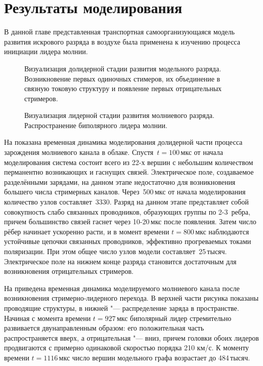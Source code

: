 \section{Результаты моделирования}
\label{sec:model-results}
В данной главе представленная транспортная самоорганизующаяся модель развития искрового разряда в воздухе была применена к изучению процесса инициации лидера молнии.
\begin{figure}[h]
	\caption{Визуализация долидерной стадии развития модельного разряда. Возникновение первых одиночных стимеров, их объединение в связную токовую структуру и появление первых отрицательных стримеров.}
	\label{fig:pre-leader}
\end{figure}

\begin{figure}[h]
	\caption{Визуализация лидерной стадии развития молниевого разряда. Распространение биполярного лидера молнии.}
	\label{fig:model-leader-composition}
\end{figure}
На  показана временная динамика моделирования долидерной части процесса зарождения молниевого канала в облаке. Спустя~$t=100$\,мкс от начала моделирования система состоит всего из 22-х вершин с небольшим количеством перманентно возникающих и гаснущих связей. Электрическое поле, создаваемое разделёнными зарядами, на данном этапе недостаточно для возникновения большего числа стримерных каналов. Через~500\,мкс от начала моделирования количество узлов составляет~3330. Разряд на данном этапе представляет собой совокупность слабо связанных проводников, образующих группы по 2-3~ребра, причем большинство связей гаснет через 10-20\,мкс после появления. Затем число рёбер начинает ускоренно расти, и в момент времени $t = 800$\,мкс наблюдаются устойчивые цепочки связанных проводников, эффективно прогреваемых токами поляризации. При этом общее число узлов модели составляет~25\,тысяч. Электрическое поле на нижнем конце разряда становится достаточным для возникновения отрицательных стримеров.

На  приведена временная динамика моделируемого молниевого канала после возникновения стримерно-лидерного перехода. В верхней части рисунка показаны проводящие структуры, в нижней "--- распределение заряда в пространстве. Начиная с момента времени $t = 927$\,мкс биполярный лидер стремительно развивается двунаправленным образом: его положительная часть распространяется вверх, а отрицательная "--- вниз, причем головки обоих лидеров продвигаются с примерно одинаковой скоростью порядка 210 км/с. К моменту времени $t = 1116$\,мкс число вершин модельного графа возрастает до 484\,тысяч.

